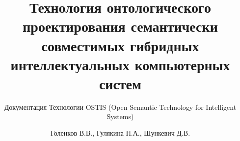 \documentclass[graybox,envcountchap,sectrefs]{svmono}
\begin{document}
\DeactivateBG
\author{Голенков В.В., Гулякина Н.А., Шункевич Д.В.}
\title{Технология онтологического проектирования семантически совместимых гибридных интеллектуальных компьютерных систем}
\subtitle{Документация Технологии OSTIS (Open Semantic Technology for Intelligent Systems)}
\maketitle

\mainmatter%
\normalsize
\ActivateBG
\addtocounter{chapter}{-1}


\ActivateBG
%

%
%
%
%

%

%
%

\backmatter%
%

\end{document}
